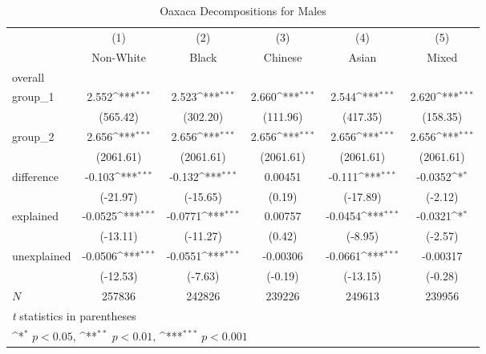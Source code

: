 \begin{table}[htbp]\centering
\def\sym#1{\ifmmode^{#1}\else\(^{#1}\)\fi}
\caption{Oaxaca Decompositions for Males\label{tab1}}
\begin{tabular}{l*{5}{c}}
\hline\hline
            &\multicolumn{1}{c}{(1)}&\multicolumn{1}{c}{(2)}&\multicolumn{1}{c}{(3)}&\multicolumn{1}{c}{(4)}&\multicolumn{1}{c}{(5)}\\
            &\multicolumn{1}{c}{Non-White}&\multicolumn{1}{c}{Black}&\multicolumn{1}{c}{Chinese}&\multicolumn{1}{c}{Asian}&\multicolumn{1}{c}{Mixed}\\
\hline
overall     &                     &                     &                     &                     &                     \\
group\_1     &       2.552\sym{***}&       2.523\sym{***}&       2.660\sym{***}&       2.544\sym{***}&       2.620\sym{***}\\
            &    (565.42)         &    (302.20)         &    (111.96)         &    (417.35)         &    (158.35)         \\
group\_2     &       2.656\sym{***}&       2.656\sym{***}&       2.656\sym{***}&       2.656\sym{***}&       2.656\sym{***}\\
            &   (2061.61)         &   (2061.61)         &   (2061.61)         &   (2061.61)         &   (2061.61)         \\
difference  &      -0.103\sym{***}&      -0.132\sym{***}&     0.00451         &      -0.111\sym{***}&     -0.0352\sym{*}  \\
            &    (-21.97)         &    (-15.65)         &      (0.19)         &    (-17.89)         &     (-2.12)         \\
explained   &     -0.0525\sym{***}&     -0.0771\sym{***}&     0.00757         &     -0.0454\sym{***}&     -0.0321\sym{*}  \\
            &    (-13.11)         &    (-11.27)         &      (0.42)         &     (-8.95)         &     (-2.57)         \\
unexplained &     -0.0506\sym{***}&     -0.0551\sym{***}&    -0.00306         &     -0.0661\sym{***}&    -0.00317         \\
            &    (-12.53)         &     (-7.63)         &     (-0.19)         &    (-13.15)         &     (-0.28)         \\
\hline
\(N\)       &      257836         &      242826         &      239226         &      249613         &      239956         \\
\hline\hline
\multicolumn{6}{l}{\footnotesize \textit{t} statistics in parentheses}\\
\multicolumn{6}{l}{\footnotesize \sym{*} \(p<0.05\), \sym{**} \(p<0.01\), \sym{***} \(p<0.001\)}\\
\end{tabular}
\label{tab:oaxaca_male_summary}
\end{table}
